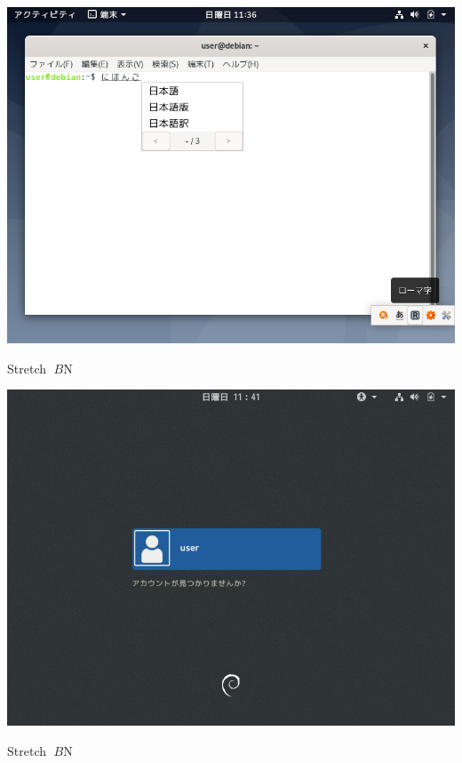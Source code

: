 \documentclass[mingoth,a4paper]{jsarticle}
\begin{document}
{{\begin{center}
\includegraphics[keepaspectratio,width=1\hsize]{image201907/buster_gnome_3.png}
\end{center}



Stretch $B$N%

\begin{center}
\includegraphics[keepaspectratio,width=1\hsize]{image201907/stretch_gdm3.png}
\end{center}



Stretch $B$N%

}}
\end{document}
